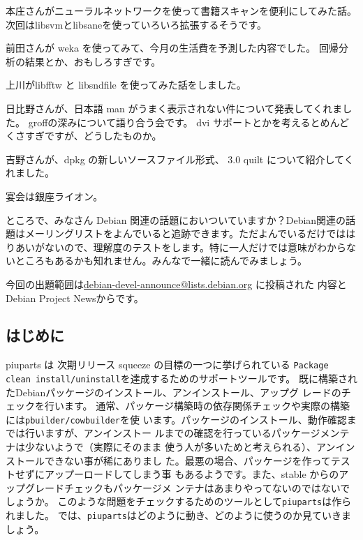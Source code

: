 \documentclass[mingoth,a4paper]{jsarticle}
\begin{document}
本庄さんがニューラルネットワークを使って書籍スキャンを便利にしてみた話。
次回はlibsvmとlibsaneを使っていろいろ拡張するそうです。

前田さんが weka を使ってみて、今月の生活費を予測した内容でした。
回帰分析の結果とか、おもしろすぎです。

上川がlibfftw と libsndfile を使ってみた話をしました。

日比野さんが、日本語 man がうまく表示されない件について発表してくれました。
groffの深みについて語り合う会です。
dvi サポートとかを考えるとめんどくさすぎですが、どうしたものか。

吉野さんが、dpkg の新しいソースファイル形式、
3.0 quilt について紹介してくれました。

宴会は銀座ライオン。


ところで、みなさん Debian 関連の話題においついていますか？Debian関連の話
題はメーリングリストをよんでいると追跡できます。ただよんでいるだけではは
りあいがないので、理解度のテストをします。特に一人だけでは意味がわからな
いところもあるかも知れません。みんなで一緒に読んでみましょう。

今回の出題範囲は\url{debian-devel-announce@lists.debian.org} に投稿された
内容とDebian Project Newsからです。

\begin{multicols}{2}
 
\end{multicols}

\clearpage


\subsection{はじめに}
piuparts は 次期リリース squeeze の目標の一つに挙げられている
\texttt{Package clean install/uninstall}を達成するためのサポートツールです。
既に構築されたDebianパッケージのインストール、アンインストール、アップグ
レードのチェックを行います。
通常、パッケージ構築時の依存関係チェックや実際の構築には\texttt{pbuilder/cowbuilder}を使
います。パッケージのインストール、動作確認までは行いますが、アンインストー
ルまでの確認を行っているパッケージメンテナは少ないようで（実際にそのまま
使う人が多いためと考えられる）、アンインストールできない事が稀にありまし
た。最悪の場合、パッケージを作ってテストせずにアップーロードしてしまう事
もあるようです。また、stable からのアップグレードチェックもパッケージメ
ンテナはあまりやってないのではないでしょうか。
このような問題をチェックするためのツールとして\texttt{piuparts}は作られました。
では、\texttt{piuparts}はどのように動き、どのように使うのか見ていきましょう。
\end{document}
